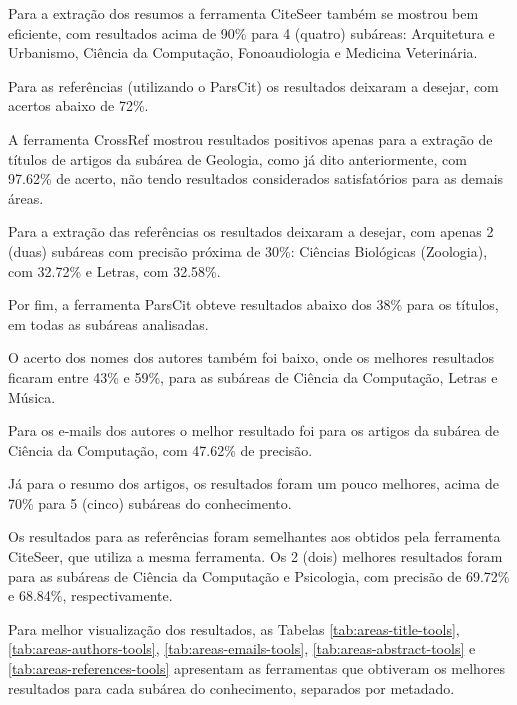 Para a extração dos resumos a ferramenta CiteSeer também se mostrou bem eficiente, com resultados acima de 90\% para 4 (quatro) subáreas: Arquitetura e Urbanismo, Ciência da Computação, Fonoaudiologia e Medicina Veterinária. 

Para as referências (utilizando o ParsCit) os resultados deixaram a desejar, com acertos abaixo de 72\%.

A ferramenta CrossRef mostrou resultados positivos apenas para a extração de títulos de artigos da subárea de Geologia, como já dito anteriormente, com 97.62\% de acerto, não tendo resultados considerados satisfatórios para as demais áreas. 

Para a extração das referências os resultados deixaram a desejar, com apenas 2 (duas) subáreas com precisão próxima de 30\%: Ciências Biológicas (Zoologia), com 32.72\% e Letras, com 32.58\%.

Por fim, a ferramenta ParsCit obteve resultados abaixo dos 38\% para os títulos, em todas as subáreas analisadas. 

O acerto dos nomes dos autores também foi baixo, onde os melhores resultados ficaram entre 43\% e 59\%, para as subáreas de Ciência da Computação, Letras e Música. 

Para os e-mails dos autores o melhor resultado foi para os artigos da subárea de Ciência da Computação, com 47.62\% de precisão. 

Já para o resumo dos artigos, os resultados foram um pouco melhores, acima de 70\% para 5 (cinco) subáreas do conhecimento. 

Os resultados para as referências foram semelhantes aos obtidos pela ferramenta CiteSeer, que utiliza a mesma ferramenta. Os 2 (dois) melhores resultados foram para as subáreas de Ciência da Computação e Psicologia, com precisão de 69.72\% e 68.84\%, respectivamente.

Para melhor visualização dos resultados, as Tabelas \ref{tab:areas-title-tools}, \ref{tab:areas-authors-tools}, \ref{tab:areas-emails-tools}, \ref{tab:areas-abstract-tools} e \ref{tab:areas-references-tools} apresentam as ferramentas que obtiveram os melhores resultados para cada subárea do conhecimento, separados por metadado. 

